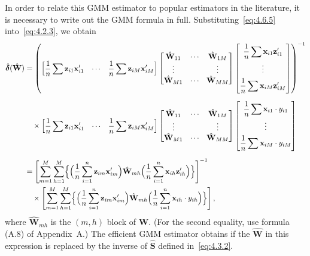 In order to relate this GMM estimator to popular estimators in the literature,
it is necessary to write out the GMM formula in full. Substituting~\eqref{eq:4.6.5}
into~\eqref{eq:4.2.3}, we obtain
\begin{align}
\hat{\boldsymbol{\delta}}(\hat{\mathbf{W}})
&= \left(
\begin{bmatrix}
\dfrac{1}{n} \displaystyle\sum \mathbf{z}_{i1} \mathbf{x}_{i1}' & \cdots &
\dfrac{1}{n} \displaystyle\sum \mathbf{z}_{iM} \mathbf{x}_{iM}'
\end{bmatrix}
\begin{bmatrix}
\hat{\mathbf{W}}_{11} & \cdots & \hat{\mathbf{W}}_{1M} \\
\vdots & & \vdots \\
\hat{\mathbf{W}}_{M1} & \cdots & \hat{\mathbf{W}}_{MM}
\end{bmatrix}
\begin{bmatrix}
\dfrac{1}{n} \displaystyle\sum \mathbf{x}_{i1} \mathbf{z}_{i1}' \\[6pt]
\vdots \\[4pt]
\dfrac{1}{n} \displaystyle\sum \mathbf{x}_{iM} \mathbf{z}_{iM}'
\end{bmatrix}
\right)^{-1} \notag \\[6pt]
&\quad \times
\begin{bmatrix}
\dfrac{1}{n} \displaystyle\sum \mathbf{z}_{i1} \mathbf{x}_{i1}' & \cdots &
\dfrac{1}{n} \displaystyle\sum \mathbf{z}_{iM} \mathbf{x}_{iM}'
\end{bmatrix}
\begin{bmatrix}
\hat{\mathbf{W}}_{11} & \cdots & \hat{\mathbf{W}}_{1M} \\
\vdots & & \vdots \\
\hat{\mathbf{W}}_{M1} & \cdots & \hat{\mathbf{W}}_{MM}
\end{bmatrix}
\begin{bmatrix}
\dfrac{1}{n} \displaystyle\sum \mathbf{x}_{i1} \cdot y_{i1} \\[6pt]
\vdots \\[4pt]
\dfrac{1}{n} \displaystyle\sum \mathbf{x}_{iM} \cdot y_{iM}
\end{bmatrix} \notag \\[6pt]
&= \left[\sum_{m=1}^{M} \sum_{h=1}^{M}
\Bigl\{\Bigl(\frac{1}{n} \sum_{i=1}^{n} \mathbf{z}_{im} \mathbf{x}_{im}'\Bigr)
\hat{\mathbf{W}}_{mh}
\Bigl(\frac{1}{n} \sum_{i=1}^{n} \mathbf{x}_{ih} \mathbf{z}_{ih}'\Bigr)
\Bigr\}\right]^{-1} \notag \\
&\quad \times
\left[\sum_{m=1}^{M} \sum_{h=1}^{M}
\Bigl\{\Bigl(\frac{1}{n} \sum_{i=1}^{n} \mathbf{z}_{im} \mathbf{x}_{im}'\Bigr)
\hat{\mathbf{W}}_{mh}
\Bigl(\frac{1}{n} \sum_{i=1}^{n} \mathbf{x}_{ih} \cdot y_{ih}\Bigr)
\Bigr\}\right],
\label{eq:4.6.6}
\end{align}
where $\hat{\mathbf{W}}_{mh}$ is the $(m,h)$ block of $\hat{\mathbf{W}}$.
(For the second equality, use formula (A.8) of Appendix~A.)
The efficient GMM estimator obtains if the $\hat{\mathbf{W}}$ in this expression
is replaced by the inverse of $\widehat{\mathbf{S}}$ defined in~\eqref{eq:4.3.2}.


